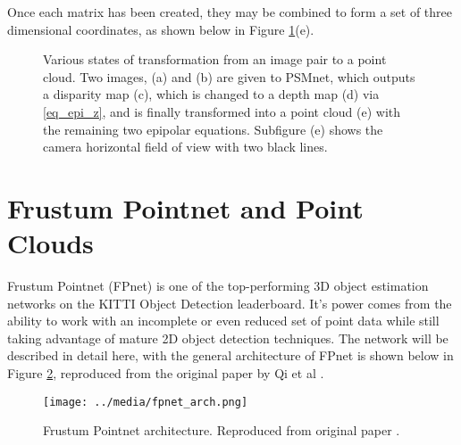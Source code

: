 Once each matrix has been created, they may be combined to form a set of three dimensional coordinates, as shown below in Figure \ref{reconstruction}(e). 

\begin{figure}[H]
    \centering
    \caption{Various states of transformation from an image pair to a point cloud. Two images, (a) and (b) are given to PSMnet, which outputs a disparity map (c), which is changed to a depth map (d) via \ref{eq_epi_z}, and is finally transformed into a point cloud (e) with the remaining two epipolar equations. Subfigure (e) shows the camera horizontal field of view with two black lines.}
    \label{reconstruction}
\end{figure}






\newpage
\section{Frustum Pointnet and Point Clouds} %
\label{sect_fpnet}

Frustum Pointnet (FPnet) is one of the top-performing 3D object estimation networks on the KITTI Object Detection leaderboard. It's power comes from the ability to work with an incomplete or even reduced set of point data while still taking advantage of mature 2D object detection techniques. The network will be described in detail here, with the general architecture of FPnet is shown below in Figure \ref{fpnet_arch}, reproduced from the original paper by Qi et al \cite{qi_frustum_2017}. 

\begin{figure}[H]
    \centering
    \texttt{[image: ../media/fpnet\_arch.png]}
    \caption{Frustum Pointnet architecture. Reproduced from original paper \cite{qi_frustum_2017}.}
    \label{fpnet_arch}
\end{figure}

